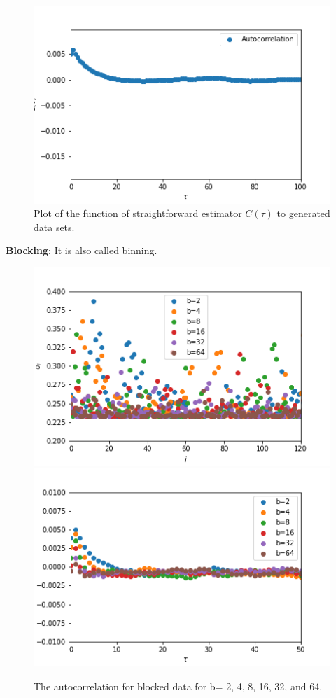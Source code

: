\documentclass[11pt, a4paper, DIV=12]{scrartcl}
\begin{document}
\begin{figure}[H]
	\centering
	\includegraphics[width=0.6\linewidth]{autokorrelation.png}
	\caption{Plot of the function of straightforward estimator $ C(\tau) $ to generated data sets.}
	\label{fig:autocorrelation}
\end{figure}

\textbf{Blocking}: It is also called binning.
\begin{figure}[H]
	\centering
	\includegraphics[width=0.6\linewidth]{blocking_standard_deviation.png}\includegraphics[width=0.6\linewidth]{blocking_autokorrelation.png}
	\caption{ The autocorrelation for blocked data for b= 2, 4, 8, 16, 32, and 64.}
	\label{fig:blockingAutocorrelation}
\end{figure}
\end{document}
